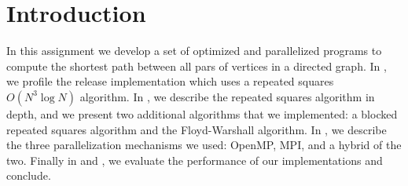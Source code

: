 \section{Introduction}\label{sec:intro}
In this assignment we develop a set of optimized and parallelized programs to
compute the shortest path between all pars of vertices in a directed graph. In
, we profile the release implementation which uses a repeated
squares $O(N^3 \log N)$ algorithm. In , we describe the repeated
squares algorithm in depth, and we present two additional algorithms that we
implemented: a blocked repeated squares algorithm and the Floyd-Warshall
algorithm. In , we describe the three parallelization
mechanisms we used: OpenMP, MPI, and a hybrid of the two. Finally in
 and , we evaluate the performance of our
implementations and conclude.
